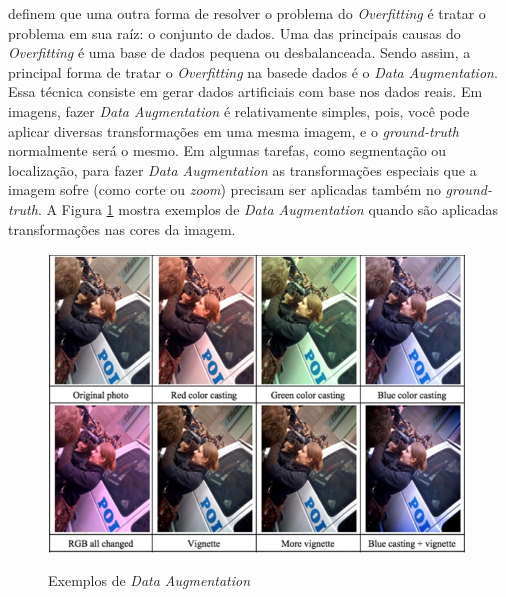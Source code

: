  definem que uma outra forma de resolver o problema do \textit{Overfitting} é tratar o problema em sua raíz: o conjunto de dados. Uma das principais causas do \textit{Overfitting} é uma base de dados pequena ou desbalanceada. Sendo assim, a principal forma de tratar o \textit{Overfitting} na basede dados é o \textit{Data Augmentation}. Essa técnica consiste em gerar dados artificiais com base nos dados reais. Em imagens, fazer \textit{Data Augmentation} é relativamente simples, pois, você pode aplicar diversas transformações em uma mesma imagem, e o \textit{ground-truth} normalmente será o mesmo. Em algumas tarefas, como segmentação ou localização, para fazer \textit{Data Augmentation} as transformações especiais que a imagem sofre (como corte ou \textit{zoom}) precisam ser aplicadas também no  \textit{ground-truth}. A Figura \ref{fig:data-aug} mostra exemplos de \textit{Data Augmentation} quando são aplicadas transformações nas cores da imagem.


  \begin{figure}[H]
  \setlength{\abovecaptionskip}{0pt}
  \setlength{\belowcaptionskip}{0pt}
  \caption[Exemplos de \textit{Data Augmentation}]{Exemplos de \textit{Data Augmentation}}
  \centering
  \includegraphics[width=.5\textwidth]{imagem/0x_data-augmentation.png}
  \captionsetup{justification=centering}
  \label{fig:data-aug}
 \end{figure}




